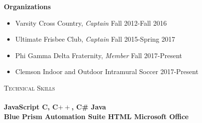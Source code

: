 \documentclass[a4paper]{article}
\newcommand{\lineunder} {
    \vspace*{-8pt} \\
    \hspace*{-18pt} \hrulefill \\
}
\newcommand{\header} [1] {
    {\hspace*{-18pt}\vspace*{6pt} \textsc{#1}}
    \vspace*{-6pt} \lineunder
}
\begin{document}
\textbf{Organizations} \vspace{-5pt}

\begin{itemize}
\item Varsity Cross Country, \textit{Captain} \hfill \hfill Fall 2012-Fall 2016 \vspace{-5pt} 
\item Ultimate Frisbee Club, \textit{Captain} \hfill \hfill Fall 2015-Spring 2017 \vspace{-5pt}  
\item Phi Gamma Delta Fraternity, \textit{Member} \hfill \hfill Fall 2017-Present \vspace{-5pt} 
\item Clemson Indoor and Outdoor Intramural Soccer \hfill \hfill 2017-Present \vspace{-5pt} 
\end{itemize}
\header {Technical Skills} 
\textbf{JavaScript \hspace{130pt}   C, C$++$, C\# \hspace{155pt} Java} \\
\textbf{Blue Prism Automation Suite \hspace{49pt} HTML \hspace{111pt} Microsoft Office}
\end{document}
